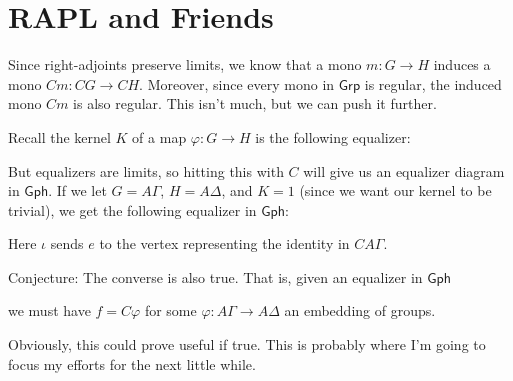 \documentclass[12pt]{article}
\theoremstyle{definition}
\begin{document}
\section{RAPL and Friends}

Since right-adjoints preserve limits, we know that a mono $m : G \to H$
induces a mono $Cm : CG \to CH$. Moreover, since every mono in $\mathsf{Grp}$
is regular, the induced mono $Cm$ is also regular. This isn't much, but
we can push it further.

Recall the kernel $K$ of a map $\varphi : G \to H$ is the following
equalizer:

\begin{center}
\end{center}

But equalizers are limits, so hitting this with $C$ will give us an equalizer
diagram in $\mathsf{Gph}$. If we let $G = A\Gamma$, $H = A\Delta$, and $K = 1$
(since we want our kernel to be trivial), we get the following equalizer in
$\mathsf{Gph}$:

\begin{center}
\end{center}

Here $\iota$ sends $e$ to the vertex representing the identity in $CA\Gamma$.

Conjecture: The converse is also true. That is, given an equalizer in $\mathsf{Gph}$

\begin{center}
\end{center}

we must have $f = C\varphi$ for some $\varphi : A\Gamma \to A\Delta$ an embedding of groups.

Obviously, this could prove useful if true. This is probably where I'm going to
focus my efforts for the next little while.
\end{document}
